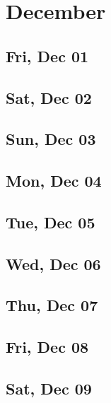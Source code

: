 \chapter{December}
	\section{Fri, Dec 01}
		
		
	\section{Sat, Dec 02}
		
		
	\section{Sun, Dec 03}
		
		
	\section{Mon, Dec 04}
		
		
	\section{Tue, Dec 05}
		
		
	\section{Wed, Dec 06}
		
		
	\section{Thu, Dec 07}
		
		
	\section{Fri, Dec 08}
		
		
	\section{Sat, Dec 09}
		
		
